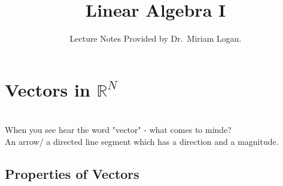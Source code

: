 \documentclass{report}
\begin{document}
\title{Linear Algebra I}
\author{Lecture Notes Provided by Dr.~Miriam Logan.}
\date{}
\maketitle
\tableofcontents
\newpage  
  \section{Vectors in $\mathbb{R}^{N}$}\\
  When you see hear the word "vector" - what comes to minde?\\ An arrow/ a directed line segment which has a direction and a magnitude.\\
  
\subsection{Properties of Vectors}
\end{document}
